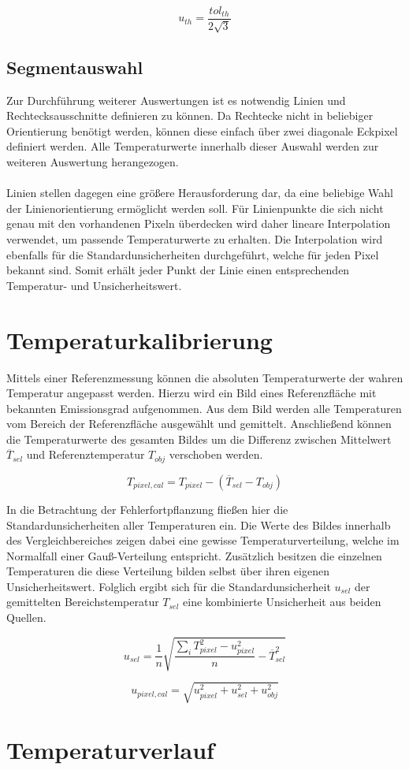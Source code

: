 \documentclass[10pt,a4paper,german]{article}
\begin{document}
\begin{equation}
    u_{th} = \frac{tol_{th}}{2\sqrt{3}}
\end{equation}

\subsection{Segmentauswahl}
Zur Durchführung weiterer Auswertungen ist es notwendig Linien und Rechtecksausschnitte definieren zu können.
Da Rechtecke nicht in beliebiger Orientierung benötigt werden, können diese einfach über zwei diagonale Eckpixel definiert werden.
Alle Temperaturwerte innerhalb dieser Auswahl werden zur weiteren Auswertung herangezogen.
\\
\\
Linien stellen dagegen eine größere Herausforderung dar, da eine beliebige Wahl der Linienorientierung ermöglicht werden soll.
Für Linienpunkte die sich nicht genau mit den vorhandenen Pixeln überdecken wird daher lineare Interpolation verwendet, um passende Temperaturwerte zu erhalten.
Die Interpolation wird ebenfalls für die Standardunsicherheiten durchgeführt, welche für jeden Pixel bekannt sind.
Somit erhält jeder Punkt der Linie einen entsprechenden Temperatur- und Unsicherheitswert.

\section{Temperaturkalibrierung}
Mittels einer Referenzmessung können die absoluten Temperaturwerte der wahren Temperatur angepasst werden.
Hierzu wird ein Bild eines Referenzfläche mit bekannten Emissionsgrad aufgenommen.
Aus dem Bild werden alle Temperaturen vom Bereich der Referenzfläche ausgewählt und gemittelt.
Anschließend können die Temperaturwerte des gesamten Bildes um die Differenz zwischen Mittelwert $\overline T_{sel}$ und Referenztemperatur $T_\textit{obj}$ verschoben werden.

\begin{equation}
    T_{pixel,cal} = T_{pixel} - \left( \overline T_\textit{sel} - T_\textit{obj} \right)
\end{equation}

In die Betrachtung der Fehlerfortpflanzung fließen hier die Standardunsicherheiten aller Temperaturen ein.
Die Werte des Bildes innerhalb des Vergleichbereiches zeigen dabei eine gewisse Temperaturverteilung, welche im Normalfall einer Gauß-Verteilung entspricht.
Zusätzlich besitzen die einzelnen Temperaturen die diese Verteilung bilden selbst über ihren eigenen Unsicherheitswert.
Folglich ergibt sich für die Standardunsicherheit $u_{sel}$ der gemittelten Bereichstemperatur $T_{sel}$ eine kombinierte Unsicherheit aus beiden Quellen. 

\begin{equation}
    u_{sel} = \frac{1}{n} \sqrt{\frac{\sum_i T_\textit{pixel}^2 - u_\textit{pixel}^2}{n} - \overline T_\textit{sel}^2}
\end{equation}

\begin{equation}
    u_{pixel,cal} = \sqrt{u_{pixel}^2 + u_{sel}^2 + u_\textit{obj}^2}
\end{equation}

\section{Temperaturverlauf}
\end{document}
